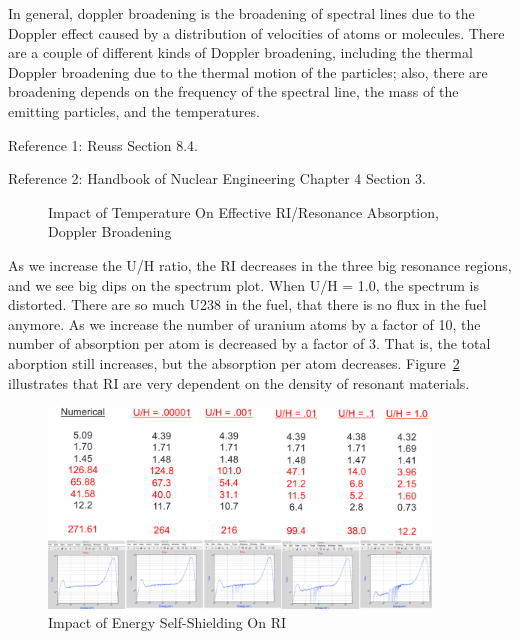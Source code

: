 \documentclass{school-22.211-notes}
\begin{document}
In general, doppler broadening is the broadening of spectral lines due to the Doppler effect caused by a distribution of velocities of atoms or molecules. There are a couple of different kinds of Doppler broadening, including the thermal Doppler broadening due to the thermal motion of the particles; also, there are broadening depends on the frequency of the spectral line, the mass of the emitting particles, and the temperatures. 

Reference 1: Reuss Section 8.4. 

Reference 2: Handbook of Nuclear Engineering Chapter 4 Section 3. 

\begin{figure}
  \centering
  \caption{Impact of Temperature On Effective RI/Resonance Absorption, Doppler Broadening} \label{Doppler}
\end{figure}

\clearpage
{}
As we increase the U/H ratio, the RI decreases in the three big resonance regions, and we see big dips on the spectrum plot. When U/H = 1.0, the spectrum is distorted. There are so much U238 in the fuel, that there is no flux in the fuel anymore. As we increase the number of uranium atoms by a factor of 10, the number of absorption per atom is decreased by a factor of 3. That is, the total aborption still increases, but the absorption per atom decreases. Figure~\ref{self-shielding} illustrates that RI are very dependent on the density of resonant materials. 
\begin{figure}
  \centering
  \includegraphics[width=4in]{images/self-shielding.png}
  \caption{Impact of Energy Self-Shielding On RI} \label{self-shielding}
\end{figure}
\end{document}
